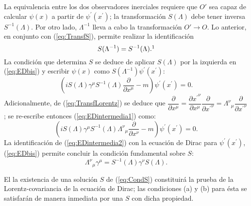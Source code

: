 La equivalencia entre los dos observadores inerciales requiere que $O'$ sea capaz de calcular $\psi(x)$ a partir de $\psi^{\prime}(x^{\prime})$; la transformación $S(\Lambda)$ debe tener inversa $S^{-1}(\Lambda)$. Por otro lado, $\Lambda^{-1}$  lleva a cabo la transformación $O'\rightarrow O$.  Lo anterior, en conjunto con (\ref{eq:TransfS}), permite realizar la identificación
\begin{equation}\label{eq:TransfInv}
S(\Lambda^{-1})=S^{-1}(\Lambda).\footnotemark
\end{equation}
La condición que determina $S$ se deduce de aplicar $S(\Lambda)$ por la izquierda en (\ref{eq:EDbis}) y escribir $\psi(x)$ como $S(\Lambda^{-1})\psi^{\prime}(x^{\prime})$:
\begin{equation}\label{eq:EDintermedia1}
	\left( iS(\Lambda)\gamma^{\mu}S^{-1}(\Lambda)\frac{\partial}{\partial x^{\mu}}-m\right)\psi^{\prime}(x^{\prime})=0.
\end{equation} 
Adicionalmente, de (\ref{eq:TransfLorentz}) se deduce que $\dfrac{\partial}{\partial x^\mu}=\dfrac{\partial {x^{\prime}}^{\nu}}{\partial x^{\mu}}\dfrac{\partial}{\partial {x^{\prime}}^{\nu}}=\Lambda^{\nu}{}_{\mu}\dfrac{\partial}{\partial {x^{\prime}}^{\nu}}$; se re-escribe entonces (\ref{eq:EDintermedia1}) como:
\begin{equation}\label{eq:EDintermedia2}
	\left( iS(\Lambda)\gamma^{\mu}S^{-1}(\Lambda)\Lambda^{\nu}{}_{\mu}\frac{\partial}{\partial x^{\nu}}-m\right)\psi^{\prime}(x^{\prime})=0.
\end{equation}
La identificación de (\ref{eq:EDintermedia2}) con la ecuación de Dirac para $\psi^{\prime}(x^{\prime})$, (\ref{eq:EDbis}) permite concluir la condición fundamental sobre $S$:
\begin{equation}\label{eq:CondS}
\Lambda^{\nu}{}_{\mu}\gamma^{\mu}=S^{-1}(\Lambda)\gamma^{\nu}S(\Lambda).
\end{equation}

El la existencia de una solución $S$ de (\ref{eq:CondS}) constituirá la prueba de la Lorentz-covariancia de la ecuación de Dirac; las condiciones (a) y (b) para ésta se satisfarán de manera inmediata por una $S$ con dicha propiedad. 

